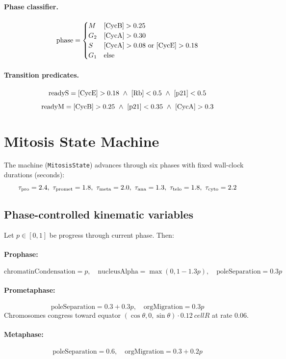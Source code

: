 \documentclass[11pt,a4paper]{article}
\newcommand{\eq}[1]{\begin{equation}#1\end{equation}}
\begin{document}
\paragraph{Phase classifier.}
\[
\text{phase}=\begin{cases}M & [\rm CycB]>0.25 \\ G_2 & [\rm CycA]>0.30 \\ S & [\rm CycA]>0.08\ \text{or}\ [\rm CycE]>0.18 \\ G_1 & \text{else}\end{cases}
\]
\paragraph{Transition predicates.}
\[ \mathrm{readyS}=[\rm CycE]>0.18\ \land\ [\rm Rb]<0.5\ \land\ [\rm p21]<0.5 \]
\[ \mathrm{readyM}=[\rm CycB]>0.25\ \land\ [\rm p21]<0.35\ \land\ [\rm CycA]>0.3 \]

\clearpage
\section{Mitosis State Machine}
\label{sec:mitosis}

The machine (\texttt{MitosisState}) advances through six phases with fixed wall-clock durations (seconds):
\[ \tau_{\rm pro}=2.4,\ \tau_{\rm promet}=1.8,\ \tau_{\rm meta}=2.0,\ \tau_{\rm ana}=1.3,\ \tau_{\rm telo}=1.8,\ \tau_{\rm cyto}=2.2 \]

\subsection{Phase-controlled kinematic variables}
Let $p\in[0,1]$ be progress through current phase. Then:

\paragraph{Prophase:}
\eq{ \text{chromatinCondensation} = p,\quad \text{nucleusAlpha}=\max(0,1-1.3p),\quad \text{poleSeparation}=0.3 p }

\paragraph{Prometaphase:}
\eq{ \text{poleSeparation}=0.3+0.3p,\quad \text{orgMigration}=0.3 p }
Chromosomes congress toward equator $(\cos\theta,0,\sin\theta)\cdot\SI{0.12}{}cellR$ at rate $0.06$.

\paragraph{Metaphase:}
\eq{ \text{poleSeparation}=0.6,\quad \text{orgMigration}=0.3+0.2 p }
\end{document}
